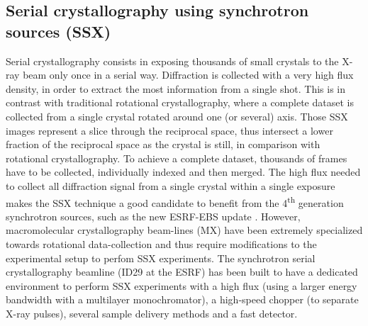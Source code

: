 \documentclass[preprint]{iucr}              %
\begin{document}
\subsection{Serial crystallography using synchrotron sources (SSX)}
%
Serial crystallography consists in exposing thousands of small crystals to the X-ray beam only once in a serial way.
Diffraction is collected with a very high flux density, in order to extract the most information from a single shot.
This is in contrast with traditional rotational crystallography, where a complete dataset is collected from a single crystal rotated around one (or several) axis. 
Those SSX images represent a slice through the reciprocal space, thus intersect a lower fraction of the reciprocal space as the crystal is still, in comparison with rotational crystallography.
To achieve a complete dataset, thousands of frames have to be collected, individually indexed and then merged.
The high flux needed to collect all diffraction signal from a single crystal within a single exposure makes the SSX technique a good candidate to benefit from the 4\textsuperscript{th} generation synchrotron sources, such as the new ESRF-EBS update \cite{EBS}.
However, macromolecular crystallography beam-lines (MX) have been extremely specialized towards rotational data-collection and thus require modifications to the experimental setup to perfom SSX experiments.
The synchrotron serial crystallography beamline (ID29 at the ESRF) has been built to have a dedicated environment to perform SSX experiments with a high flux (using a larger energy bandwidth with a multilayer monochromator), a high-speed chopper (to separate X-ray pulses), several sample delivery methods and a fast detector.
\end{document}
